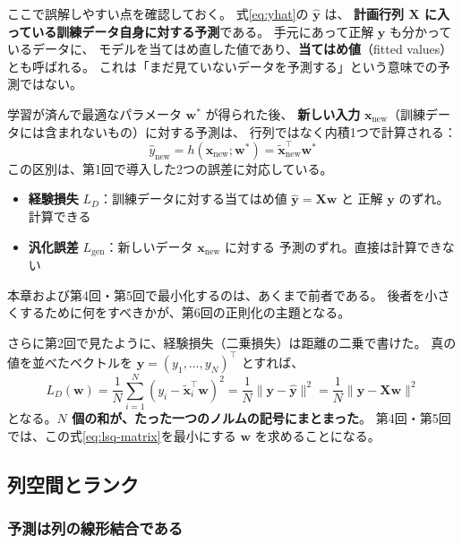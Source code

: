 
ここで誤解しやすい点を確認しておく。
式\eqref{eq:yhat}の $\hat{\bm{y}}$ は、
\textbf{計画行列 $\bm{X}$ に入っている訓練データ自身に対する予測}である。
手元にあって正解 $\bm{y}$ も分かっているデータに、
モデルを当てはめ直した値であり、\textbf{当てはめ値}（fitted values）とも呼ばれる。
これは「まだ見ていないデータを予測する」という意味での予測ではない。

学習が済んで最適なパラメータ $\bm{w}^*$ が得られた後、
\textbf{新しい入力} $\bm{x}_{\mathrm{new}}$（訓練データには含まれないもの）に対する予測は、
行列ではなく内積1つで計算される：
\begin{equation}
  \hat{y}_{\mathrm{new}} = h(\bm{x}_{\mathrm{new}}; \bm{w}^*) = \tilde{\bm{x}}_{\mathrm{new}}^\top \bm{w}^*
\end{equation}
この区別は、第1回で導入した2つの誤差に対応している。
\begin{itemize}
  \item \textbf{経験損失} $L_D$：訓練データに対する当てはめ値 $\hat{\bm{y}} = \bm{X}\bm{w}$ と
    正解 $\bm{y}$ のずれ。計算できる
  \item \textbf{汎化誤差} $L_{\mathrm{gen}}$：新しいデータ $\bm{x}_{\mathrm{new}}$ に対する
    予測のずれ。直接は計算できない
\end{itemize}
本章および第4回・第5回で最小化するのは、あくまで前者である。
後者を小さくするために何をすべきかが、第6回の正則化の主題となる。


さらに第2回で見たように、経験損失（二乗損失）は距離の二乗で書けた。
真の値を並べたベクトルを $\bm{y} = (y_1, \ldots, y_N)^\top$ とすれば、
\begin{equation}
  L_D(\bm{w}) = \frac{1}{N} \sum_{i=1}^{N} (y_i - \tilde{\bm{x}}_i^\top \bm{w})^2
  = \frac{1}{N} \|\bm{y} - \hat{\bm{y}}\|^2
  = \frac{1}{N} \|\bm{y} - \bm{X}\bm{w}\|^2
  \label{eq:lsq-matrix}
\end{equation}
となる。\textbf{$N$ 個の和が、たった一つのノルムの記号にまとまった}。
第4回・第5回では、この式\eqref{eq:lsq-matrix}を最小にする $\bm{w}$ を求めることになる。


\subsection{列空間とランク}

\subsubsection{予測は列の線形結合である}

